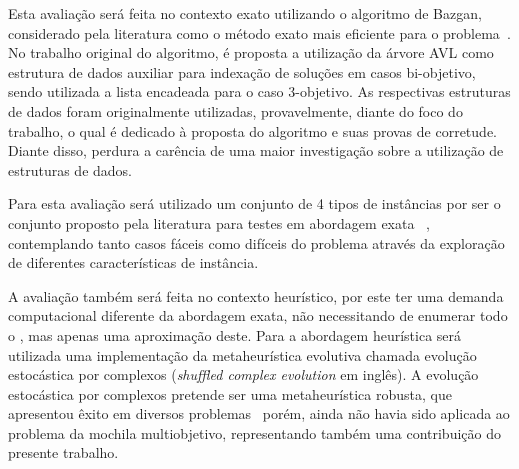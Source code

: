 
Esta avaliação será feita no contexto exato
utilizando o algoritmo de Bazgan, considerado pela literatura
como o método exato mais eficiente para o problema~\cite{bazgan2009}.
No trabalho original do algoritmo, é proposta a utilização da árvore AVL
como estrutura de dados auxiliar para indexação de soluções em casos bi-objetivo,
sendo utilizada a lista encadeada para o caso 3-objetivo.
As respectivas estruturas de dados foram originalmente utilizadas,
provavelmente, diante do foco do trabalho, o qual é dedicado à proposta do algoritmo
e suas provas de corretude.
Diante disso, perdura a carência de uma maior investigação sobre a utilização de
estruturas de dados.

Para esta avaliação será utilizado um conjunto de 4 tipos de instâncias
por ser o conjunto proposto pela literatura para testes em abordagem exata
~\cite{bazgan2009,figueira2013algorithmic,correia2018},
contemplando tanto casos fáceis como difíceis do problema através da
exploração de diferentes características de instância.

A avaliação também será feita no contexto heurístico, por este ter uma demanda computacional diferente
da abordagem exata, não necessitando de enumerar todo o \paretoset{}, mas apenas uma aproximação deste.
Para a abordagem heurística será utilizada uma implementação da metaheurística
evolutiva chamada evolução estocástica por complexos (\emph{shuffled complex evolution} em inglês).
A evolução estocástica por complexos pretende ser uma metaheurística robusta,
que apresentou êxito em diversos problemas~\cite{duan1992effective, elbeltagi2007modified, zhao2015shuffled, bhattacharjee2014shuffled, baroni2015shuffled,baroni2016shuffled} porém,
ainda não havia sido aplicada ao problema da mochila multiobjetivo,
representando também uma contribuição do presente trabalho.

